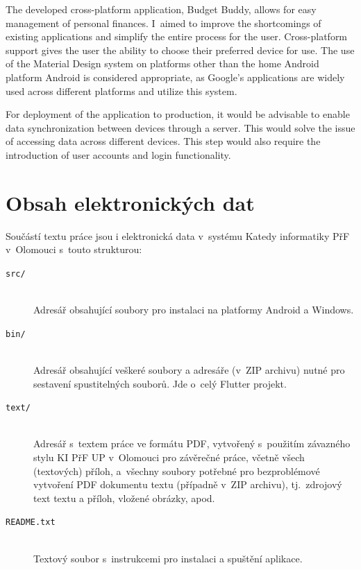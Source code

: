 \documentclass[
  biblatex,
  figures=true,
  tables=false,
  glossaries,
  index
]{kidiplom}
\begin{document}
\begin{kiconclusions}[english]
The developed cross-platform application, Budget Buddy, allows for easy management of personal finances. I~aimed to improve the shortcomings of existing applications and simplify the entire process for the user. Cross-platform support gives the user the ability to choose their preferred device for use. The use of the Material Design system on platforms other than the home Android platform Android is considered appropriate, as Google’s applications are widely used across different platforms and utilize this system.

For deployment of the application to production, it would be advisable to enable data synchronization between devices through a server. This would solve the issue of accessing data across different devices. This step would also require the introduction of user accounts and login functionality.
\end{kiconclusions}

\appendix
\section{Obsah elektronických dat} \label{sec:ObsahElData}
Součástí textu práce jsou i elektronická data v~systému Katedy informatiky PřF v~Olomouci s~touto strukturou:

\begin{description}

  \item[\texttt{src/}] \hfill \\
    Adresář obsahující soubory pro instalaci na platformy Android a Windows.
  \item[\texttt{bin/}] \hfill \\
    Adresář obsahující veškeré soubory a adresáře (v~ZIP archivu) nutné pro sestavení spustitelných souborů. Jde o~celý Flutter projekt.
  \item[\texttt{text/}] \hfill \\
    Adresář s~textem práce ve formátu PDF, vytvořený s~použitím
    závazného stylu KI PřF UP v~Olomouci pro závěrečné práce, včetně
    všech (textových) příloh, a~všechny soubory potřebné pro
    bezproblémové vytvoření PDF dokumentu textu (případně v~ZIP
    archivu), tj.~zdrojový text textu a příloh, vložené obrázky, apod.
  \item[\texttt{README.txt}] \hfill \\
    Textový soubor s~instrukcemi pro instalaci a spuštění aplikace.

\end{description}
\end{document}
